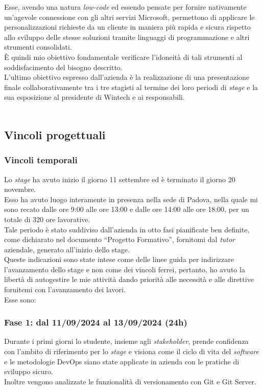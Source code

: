 Esse, avendo una natura \emph{low-code} ed essendo pensate per fornire nativamente un'agevole connessione con gli altri servizi Microsoft, permettono di applicare le personalizzazioni richieste da un cliente in maniera più rapida e sicura rispetto allo sviluppo delle stesse soluzioni tramite linguaggi di programmazione e altri strumenti consolidati.\\
È quindi mio obiettivo fondamentale verificare l'idoneità di tali strumenti al soddisfacimento del bisogno descritto.\\
L'ultimo obiettivo espresso dall'azienda è la realizzazione di una presentazione finale collaborativamente tra i tre stagisti al termine dei loro periodi di \emph{stage} e la sua esposizione al presidente di Wintech e ai responsabili.\\\\

\subsection{Vincoli progettuali}
\subsubsection*{Vincoli temporali}
Lo \emph{stage} ha avuto inizio il giorno 11 settembre ed è terminato il giorno 20 novembre.\\
Esso ha avuto luogo interamente in presenza nella sede di Padova, nella quale mi sono recato dalle ore 9:00 alle ore 13:00 e dalle ore 14:00 alle ore 18:00, per un totale di 320 ore lavorative.\\
Tale periodo è stato suddiviso dall'azienda in otto fasi pianificate ben definite, come dichiarato nel documento “Progetto Formativo”, fornitomi dal \emph{tutor} aziendale, generato all'inizio dello stage.\\
Queste indicazioni sono state intese come delle linee guida per indirizzare l'avanzamento dello stage e non come dei vincoli ferrei, pertanto, ho avuto la libertà di autogestire le mie attività dando priorità alle necessità e alle direttive fornitemi con l'avanzamento dei lavori.\\
Esse sono:
\subsubsection*{Fase 1: dal 11/09/2024 al 13/09/2024 (24h)}
Durante i primi giorni lo studente, insieme agli \emph{stakeholder}, prende confidenza con l'ambito di riferimento per lo \emph{stage} e visiona come il ciclo di vita del \emph{software} e le metodologie \gls{DevOps} siano state applicate in azienda con le pratiche di sviluppo sicuro.\\
Inoltre vengono analizzate le funzionalità di versionamento con Git e Git Server.


